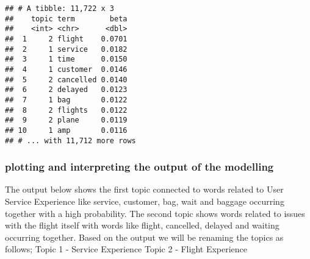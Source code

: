 \documentclass[
]{article}
\newenvironment{Shaded}{\begin{snugshade}}{\end{snugshade}}
\newcommand{\CommentTok}[1]{\textcolor[rgb]{0.56,0.35,0.01}{\textit{#1}}}
\newcommand{\DataTypeTok}[1]{\textcolor[rgb]{0.13,0.29,0.53}{#1}}
\newcommand{\DecValTok}[1]{\textcolor[rgb]{0.00,0.00,0.81}{#1}}
\newcommand{\KeywordTok}[1]{\textcolor[rgb]{0.13,0.29,0.53}{\textbf{#1}}}
\newcommand{\NormalTok}[1]{#1}
\newcommand{\OperatorTok}[1]{\textcolor[rgb]{0.81,0.36,0.00}{\textbf{#1}}}
\newcommand{\OtherTok}[1]{\textcolor[rgb]{0.56,0.35,0.01}{#1}}
\newcommand{\StringTok}[1]{\textcolor[rgb]{0.31,0.60,0.02}{#1}}
\begin{document}
\begin{verbatim}
## # A tibble: 11,722 x 3
##    topic term        beta
##    <int> <chr>      <dbl>
##  1     2 flight    0.0701
##  2     1 service   0.0182
##  3     1 time      0.0150
##  4     1 customer  0.0146
##  5     2 cancelled 0.0140
##  6     2 delayed   0.0123
##  7     1 bag       0.0122
##  8     2 flights   0.0122
##  9     2 plane     0.0119
## 10     1 amp       0.0116
## # ... with 11,712 more rows
\end{verbatim}

\hypertarget{plotting-and-interpreting-the-output-of-the-modelling}{%
\subsubsection{plotting and interpreting the output of the
modelling}\label{plotting-and-interpreting-the-output-of-the-modelling}}

The output below shows the first topic connected to words related to
User Service Experience like service, customer, bag, wait and baggage
occurring together with a high probability. The second topic shows words
related to issues with the flight itself with words like flight,
cancelled, delayed and waiting occurring together. Based on the output
we will be renaming the topics as follows; Topic 1 - Service Experience
Topic 2 - Flight Experience

\begin{Shaded}
\end{Shaded}
\end{document}
